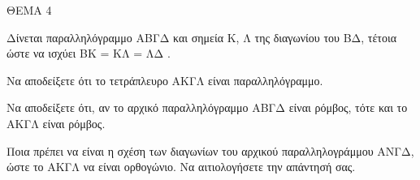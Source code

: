 
ΘΕΜΑ 4

Δίνεται παραλληλόγραμμο ΑΒΓΔ και σημεία Κ, Λ της διαγωνίου του ΒΔ, τέτοια ώστε να ισχύει ΒΚ = ΚΛ = ΛΔ .

\begin{alist}
\item Να αποδείξετε ότι το τετράπλευρο ΑΚΓΛ είναι παραλληλόγραμμο. 

\item Να αποδείξετε ότι, αν το αρχικό παραλληλόγραμμο ΑΒΓΔ είναι ρόμβος, τότε και το ΑΚΓΛ είναι ρόμβος. 

\item Ποια πρέπει να είναι η σχέση των διαγωνίων του αρχικού παραλληλογράμμου ΑΝΓΔ, ώστε το ΑΚΓΛ να είναι ορθογώνιο. Να αιτιολογήσετε την απάντησή σας. 
\end{alist}
